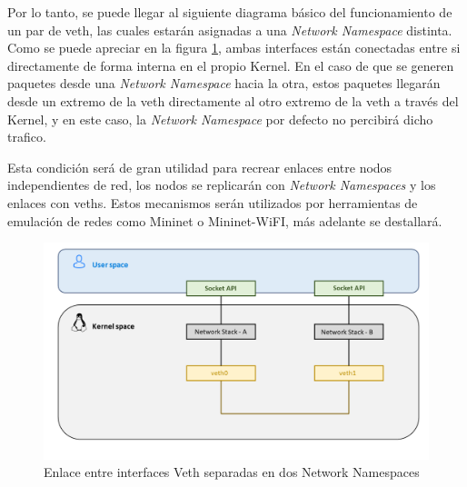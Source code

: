 Por lo tanto, se puede llegar al siguiente diagrama básico del funcionamiento de un par de \gls{veth}, las cuales estarán asignadas a una \textit{Network Namespace} distinta.  Como se puede apreciar en la figura \ref{fig:linuxNet_veth}, ambas interfaces están conectadas entre si directamente de forma interna en el propio Kernel. En el caso de que se generen paquetes desde una \textit{Network Namespace} hacia la otra, estos paquetes llegarán desde un extremo de la \gls{veth} directamente al otro extremo de la \gls{veth} a través del Kernel, y en este caso, la \textit{Network Namespace} por defecto no percibirá dicho trafico.\\
\par
Esta condición será de gran utilidad para recrear enlaces entre nodos independientes de red, los nodos se replicarán con \textit{Network Namespaces} y los enlaces con \gls{veth}s. Estos mecanismos serán utilizados por herramientas de emulación de redes como Mininet o Mininet-WiFI, más adelante se destallará. 

\begin{figure}[ht]
    \centering
    \includegraphics[width=15.5cm]{archivos/img/teoria/user_kernel.png}
    \caption{Enlace entre interfaces Veth separadas en dos Network Namespaces}
    \label{fig:linuxNet_veth}
\end{figure}